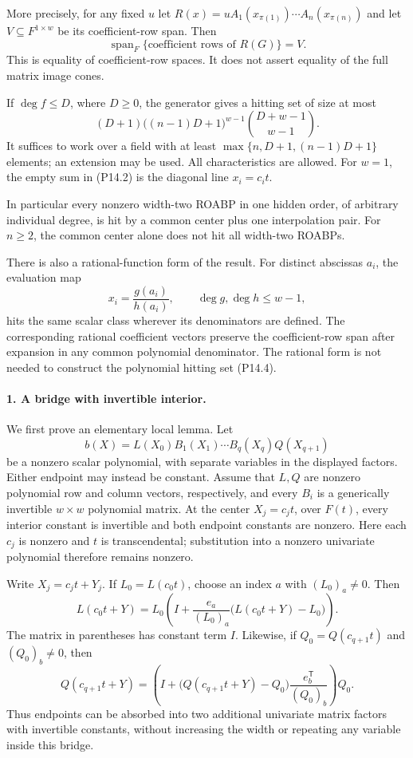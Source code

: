 More precisely, for any fixed $u$ let
$R(x)=uA_1(x_{\pi(1)})\cdots A_n(x_{\pi(n)})$ and let
$V\subseteq F^{1\times w}$ be its coefficient-row span. Then
\[
 \operatorname{span}_F\{\text{coefficient rows of }R(G)\}=V.
 \tag{P14.3}
\]
This is equality of coefficient-row spaces. It does not assert
equality of the full matrix image cones.

If $\deg f\leq D$, where $D\geq0$, the generator gives a hitting
set of size at most
\[
 (D+1)\bigl((n-1)D+1\bigr)^{w-1}
             \binom{D+w-1}{w-1}.
 \tag{P14.4}
\]
It suffices to work over a field with at least
$\max\{n,D+1,(n-1)D+1\}$ elements; an extension may be used.
All characteristics are allowed. For $w=1$, the empty sum in
(P14.2) is the diagonal line $x_i=c_it$.

In particular every nonzero width-two ROABP in one hidden order,
of arbitrary individual degree, is hit by a common center plus
one interpolation pair. For $n\geq2$, the common center alone
does not hit all width-two ROABPs.

There is also a rational-function form of the result. For distinct
abscissas $a_i$, the evaluation map
\[
 x_i=\frac{g(a_i)}{h(a_i)},\qquad
 \deg g,\deg h\leq w-1,
 \tag{P14.5}
\]
hits the same scalar class wherever its denominators are defined.
The corresponding rational coefficient vectors preserve the
coefficient-row span after expansion in any common polynomial
denominator. The rational form is not needed to construct the
polynomial hitting set (P14.4).

\paragraph{1. A bridge with invertible interior.}
We first prove an elementary local lemma. Let
\[
 b(X)=L(X_0)B_1(X_1)\cdots B_q(X_q)Q(X_{q+1})
 \tag{P14.6}
\]
be a nonzero scalar polynomial, with separate variables in the
displayed factors. Either endpoint may instead be constant.
Assume that $L,Q$ are nonzero polynomial row and column vectors,
respectively, and every $B_i$ is a generically invertible
$w\times w$ polynomial matrix. At the center $X_j=c_jt$, over
$F(t)$, every interior constant is invertible and both endpoint
constants are nonzero. Here each $c_j$ is nonzero and $t$ is
transcendental; substitution into a nonzero univariate polynomial
therefore remains nonzero.

Write $X_j=c_jt+Y_j$. If $L_0=L(c_0t)$, choose an index $a$ with
$(L_0)_a\ne0$. Then
\[
 L(c_0t+Y)=L_0\left(I+
       \frac{e_a}{(L_0)_a}\bigl(L(c_0t+Y)-L_0\bigr)\right).
 \tag{P14.7}
\]
The matrix in parentheses has constant term $I$. Likewise, if
$Q_0=Q(c_{q+1}t)$ and $(Q_0)_b\ne0$, then
\[
 Q(c_{q+1}t+Y)=\left(I+
       \bigl(Q(c_{q+1}t+Y)-Q_0\bigr)
                      \frac{e_b^{\mathsf T}}{(Q_0)_b}\right)Q_0.
 \tag{P14.8}
\]
Thus endpoints can be absorbed into two additional univariate
matrix factors with invertible constants, without increasing
the width or repeating any variable inside this bridge.

